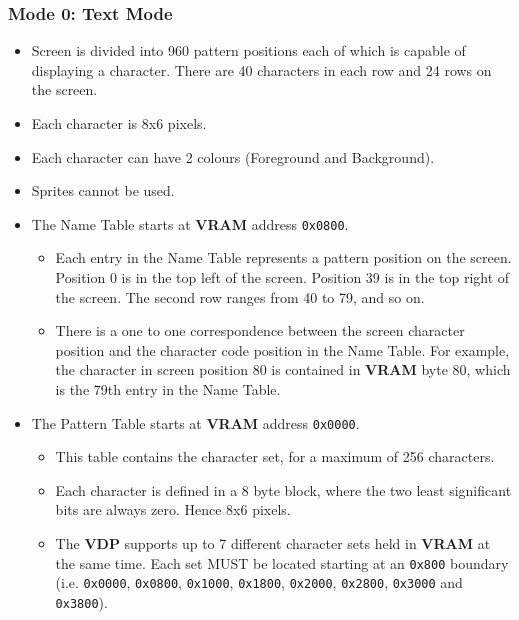 \documentclass[a4paper,11pt]{article}
\begin{document}
    
        \subsubsection{Mode 0: \textbf{Text Mode}}
        \begin{itemize}
            \item Screen is divided into 960 pattern positions each of which is
                capable of displaying a character. There are 40 characters in
                each row and 24 rows on the screen.
            \item Each character is 8x6 pixels.
            \item Each character can have 2 colours (Foreground and Background).
            \item Sprites cannot be used.
            \item The Name Table starts at \textbf{VRAM} address \texttt{0x0800}.
            \begin{itemize}
                \item Each entry in the Name Table represents a pattern position
                    on the screen. Position 0 is in the top left of the screen.
                    Position 39 is in the top right of the screen. The second
                    row ranges from 40 to 79, and so on.
                \item There is a one to one correspondence between the screen
                    character position and the character code position in the
                    Name Table. For example, the character in screen position 80
                    is contained in \textbf{VRAM} byte 80, which is the 79th
                    entry in the Name Table.
            \end{itemize}
            \item The Pattern Table starts at \textbf{VRAM} address \texttt{0x0000}.
            \begin{itemize}
                \item This table contains the character set, for a maximum of
                    256 characters.
                \item Each character is defined in a 8 byte block, where the two
                    least significant bits are always zero. Hence 8x6 pixels.
                \item The \textbf{VDP} supports up to 7 different character sets
                    held in \textbf{VRAM} at the same time. Each set MUST be
                    located starting at an \texttt{0x800} boundary (i.e. 
                    \texttt{0x0000}, \texttt{0x0800}, \texttt{0x1000},
                    \texttt{0x1800}, \texttt{0x2000}, \texttt{0x2800},
                    \texttt{0x3000} and \texttt{0x3800}).
            \end{itemize}
        \end{itemize}
\end{document}
